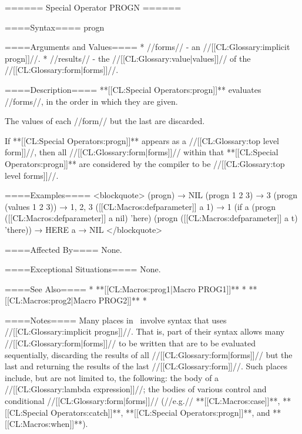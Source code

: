 ====== Special Operator PROGN ======

====Syntax====
\DefspecWithValues progn {} {}

====Arguments and Values====
  * //forms// - an //[[CL:Glossary:implicit progn]]//.
  * //results// - the //[[CL:Glossary:value|values]]// of the //[[CL:Glossary:form|forms]]//.

====Description====
**[[CL:Special Operators:progn]]** evaluates //forms//, in the order in which they are given.

The values of each //form// but the last are discarded.

If **[[CL:Special Operators:progn]]** appears as a //[[CL:Glossary:top level form]]//, then all //[[CL:Glossary:form|forms]]// within that **[[CL:Special Operators:progn]]** are considered by the compiler to be //[[CL:Glossary:top level forms]]//.

====Examples==== <blockquote> (progn) → NIL (progn 1 2 3) → 3 (progn (values 1 2 3)) → 1, 2, 3 ([[CL:Macros:defparameter]] a 1) → 1 (if a (progn ([[CL:Macros:defparameter]] a nil) 'here) (progn ([[CL:Macros:defparameter]] a t) 'there)) → HERE a → NIL </blockquote>

====Affected By====
None.

====Exceptional Situations====
None.

====See Also====
  * **[[CL:Macros:prog1|Macro PROG1]]**
  * **[[CL:Macros:prog2|Macro PROG2]]**
  * {\secref\Evaluation}

====Notes====
Many places in \clisp\ involve syntax that uses //[[CL:Glossary:implicit progns]]//. That is, part of their syntax allows many //[[CL:Glossary:form|forms]]// to be written that are to be evaluated sequentially, discarding the results of all //[[CL:Glossary:form|forms]]// but the last and returning the results of the last //[[CL:Glossary:form]]//. Such places include, but are not limited to, the following: the body of a //[[CL:Glossary:lambda expression]]//; the bodies of various control and conditional //[[CL:Glossary:form|forms]]// (//e.g.// **[[CL:Macros:case]]**, **[[CL:Special Operators:catch]]**, **[[CL:Special Operators:progn]]**, and **[[CL:Macros:when]]**).

